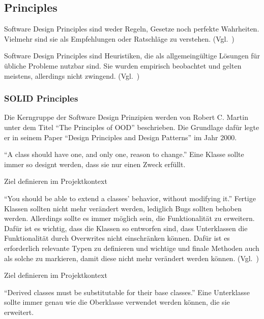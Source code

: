 \subsection{Principles}
Software Design Principles sind weder Regeln, Gesetze noch perfekte Wahrheiten.
Vielmehr sind sie als Empfehlungen oder Ratschläge zu verstehen.
(Vgl.~\cite{getting-a-solid-start})

Software Design Principles sind Heuristiken, die als allgemeingültige Lösungen für übliche Probleme nutzbar sind.
Sie wurden empirisch beobachtet und gelten meistens, allerdings nicht zwingend.
(Vgl.~\cite{getting-a-solid-start})

\subsubsection{SOLID Principles}
Die Kerngruppe der Software Design Prinzipien werden von Robert C. Martin unter dem Titel \enquote{The Principles of OOD}\cite{solid} beschrieben.
Die Grundlage dafür legte er in seinem Paper \enquote{Design Principles and Design Patterns}\cite{design-principles-and-design-patterns} im Jahr 2000.

\enquote{A class should have one, and only one, reason to change.}\cite{solid}
Eine Klasse sollte immer so designt werden, dass sie nur einen Zweck erfüllt\cite{different-types-of-software-design-principles}.

\color{red}
Ziel definieren im Projektkontext
\color{black}

\enquote{You should be able to extend a classes' behavior, without modifying it.}\cite{solid}
Fertige Klassen sollten nicht mehr verändert werden, lediglich Bugs sollten behoben werden.
Allerdings sollte es immer möglich sein, die Funktionalität zu erweitern.
Dafür ist es wichtig, dass die Klassen so entworfen sind, dass Unterklassen die Funktionalität durch Overwrites nicht einschränken können.
Dafür ist es erforderlich relevante Typen zu definieren und wichtige und finale Methoden auch als solche zu markieren, damit diese nicht mehr verändert werden können.
(Vgl.~\cite{different-types-of-software-design-principles})

\color{red}
Ziel definieren im Projektkontext
\color{black}

\newpage

\enquote{Derived classes must be substitutable for their base classes.}\cite{solid}
Eine Unterklasse sollte immer genau wie die Oberklasse verwendet werden können, die sie erweitert\cite{different-types-of-software-design-principles}.

